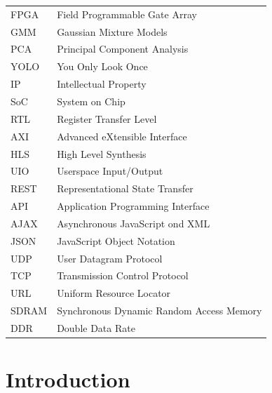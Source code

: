 \documentclass[12pt,a4paper]{report}
\begin{document}
\begin{table}[H]
\centering
\begin{tabular}{ll}
FPGA & Field Programmable Gate Array \\
GMM & Gaussian Mixture Models\\
PCA & Principal Component Analysis \\
YOLO                     & You Only Look Once                                \\
IP                       & Intellectual Property                             \\
SoC                      & System on Chip                                    \\
RTL                      & Register Transfer Level                           \\
AXI                      & Advanced eXtensible Interface                      \\
HLS                      & High Level Synthesis                              \\
UIO                      & Userspace Input/Output                            \\
REST                     & Representational State Transfer                   \\
API                      & Application Programming Interface                 \\
AJAX                     & Asynchronous JavaScript ond XML                   \\
JSON                     & JavaScript Object Notation                        \\
UDP                      & User Datagram Protocol                            \\
TCP                      & Transmission Control Protocol                     \\
URL                      & Uniform Resource Locator                          \\
SDRAM                    & Synchronous Dynamic Random Access Memory          \\
DDR                      & Double Data Rate                                 
\end{tabular}
\end{table}
\newpage
{}
\setcounter{page}{1}

\chapter{\textbf{Introduction}}
\end{document}
